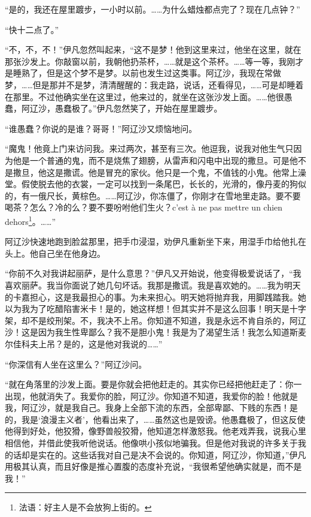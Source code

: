 \par “是的，我还在屋里踱步，一小时以前。……为什么蜡烛都点完了？现在几点钟？”
\par “快十二点了。”
\par “不，不，不！”伊凡忽然叫起来，“这不是梦！他到这里来过，他坐在这里，就在那张沙发上。你敲窗以前，我朝他扔茶杯，……就是这个茶杯。……等一等，我刚才是睡熟了，但是这个梦不是梦。以前也发生过这类事。阿辽沙，我现在常做梦，……但是那并不是梦，清清醒醒的：我走路，说话，还看得见，……可是却睡着在那里。不过他确实坐在这里过，他来过的，就坐在这张沙发上面。……他很愚蠢，阿辽沙，愚蠢极了。”伊凡忽然笑了，开始在屋里踱步。
\par “谁愚蠢？你说的是谁？哥哥！”阿辽沙又烦恼地问。
\par “魔鬼！他竟上门来访问我。来过两次，甚至有三次。他逗我，说我对他生气只因为他是一个普通的鬼，而不是烧焦了翅膀，从雷声和闪电中出现的撒旦。可是他不是撒旦，他这是撒谎。他是冒充的家伙。他只是一个鬼，不值钱的小鬼。他常上澡堂。假使脱去他的衣裳，一定可以找到一条尾巴，长长的，光滑的，像丹麦的狗似的，有一俄尺长，黄棕色。……阿辽沙，你冻僵了，你刚才在雪地里走路。要不要喝茶？怎么？冷的么？要不要吩咐他们生火？c’est à ne pas mettre un chien dehors\footnote{法语：好主人是不会放狗上街的。}。……”
\par 阿辽沙快速地跑到脸盆那里，把手巾浸湿，劝伊凡重新坐下来，用湿手巾给他扎在头上。他自己坐在他身边。
\par “你前不久对我讲起丽萨，是什么意思？”伊凡又开始说，他变得极爱说话了，“我喜欢丽萨。我当你面说了她几句坏话。我那是撒谎。我是喜欢她的。……我为明天的卡嘉担心，这是我最担心的事。为未来担心。明天她将抛弃我，用脚践踏我。她以为我为了吃醋陷害米卡！是的，她这样想！但其实并不是这么回事！明天是十字架，却不是绞刑架。不，我决不上吊。你知道不知道，我是永远不肯自杀的，阿辽沙！这是因为我生性卑鄙么？我不是胆小鬼！我是为了渴望生活！我怎么知道斯麦尔佳科夫上吊？是的，这是他对我说的……”
\par “你深信有人坐在这里么？”阿辽沙问。
\par “就在角落里的沙发上面。要是你就会把他赶走的。其实你已经把他赶走了：你一出现，他就消失了。我爱你的脸，阿辽沙。你知道不知道，我爱你的脸！他就是我，阿辽沙，就是我自己。我身上全部下流的东西，全部卑鄙、下贱的东西！是的，我是‘浪漫主义者’，他看出来了，……虽然这也是毁谤。他愚蠢极了，但这反使他得到好处，他狡猾，像野兽般狡猾，他知道怎样激怒我。他老戏弄我，说我心里相信他，并借此使我听他说话。他像哄小孩似地骗我。但是他对我说的许多关于我的话却是实在的。这些话我对自己是决不会说的。你知道，阿辽沙，你知道，”伊凡用极其认真，而且好像是推心置腹的态度补充说，“我很希望他确实就是，而不是我！”
